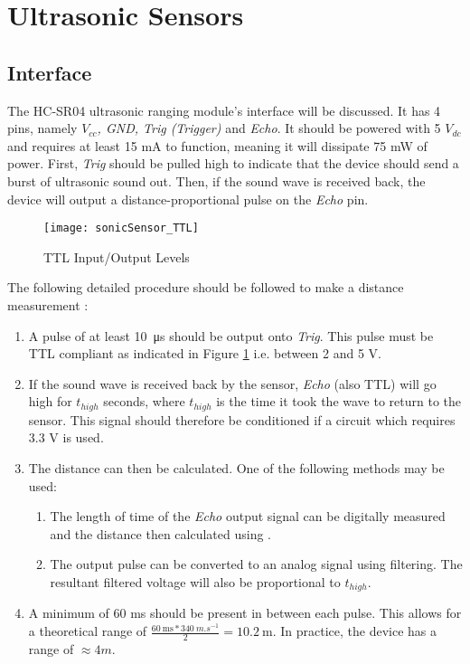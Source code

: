 \graphicspath{{content/1_literatureReview/figures/}}
\section{Ultrasonic Sensors}

\subsection{Interface}

The HC-SR04 ultrasonic ranging module's interface will be discussed. It has 4 pins, namely \textit{$V_{cc}$, GND, Trig (Trigger)} and \textit{Echo}.
It should be powered with 5 ${V_{dc}}$ and requires at least 15 mA to function, meaning it will dissipate 75 mW of power. 
First, \textit{Trig} should be pulled high to indicate that the device should send a burst of ultrasonic sound out.
Then, if the sound wave is received back, the device will output a distance-proportional pulse on the \textit{Echo} pin.

\begin{figure}[!htb]
  \centering
  \texttt{[image: sonicSensor\_TTL]}
  \caption{TTL Input/Output Levels \cite{ttlLevels}}
  \label{fig:sonicSensor_TTL}
\end{figure}

The following detailed procedure should be followed to make a distance measurement \cite{datasheetHCSR04}:
\begin{enumerate}
    \item A pulse of at least \SI{10}{\micro\second} should be output onto \textit{Trig}. This pulse must be TTL compliant as indicated
    in Figure \ref{fig:sonicSensor_TTL} i.e. between 2 and 5 V.
    \item If the sound wave is received back by the sensor, \textit{Echo} (also TTL) will go high for ${t_{high}}$ seconds, where ${t_{high}}$ is the time it took the wave to return to the sensor.
          This signal should therefore be conditioned if a circuit which requires 3.3 V is used.
    \item The distance can then be calculated. One of the following methods may be used:
    \begin{enumerate}
        \item The length of time of the \textit{Echo} output signal can be digitally measured and the distance then calculated using  \cite{datasheetHCSR04}.
        \item The output pulse can be converted to an analog signal using filtering. The resultant filtered voltage will also be proportional to $t_{high}$.
    \end{enumerate}
    \item A minimum of 60 ms should be present in between each pulse. This allows for a theoretical range of $\frac{\SI{60}{\milli\second} * \SI{340}{m.s^{-1}}}{2} = \SI{10.2}{\metre}$.
          In practice, the device has a range of $\approx 4 m$.
\end{enumerate}

